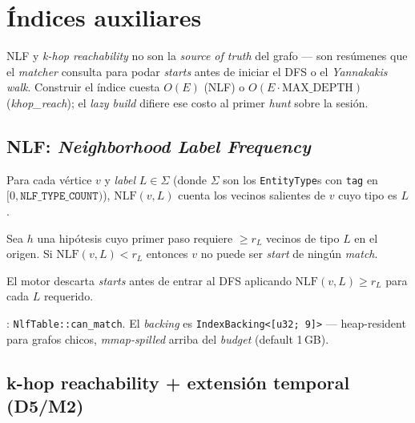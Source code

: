 \chapter{Índices auxiliares}
\label{cap:indexes}

\begin{intuicion}
NLF y \emph{k-hop reachability} no son la \emph{source of truth} del
grafo --- son resúmenes que el \emph{matcher} consulta para podar
\emph{starts} antes de iniciar el DFS o el \emph{Yannakakis walk}.
Construir el índice cuesta \(O(E)\) (NLF) o \(O(E \cdot \mathrm{MAX\_DEPTH})\)
(\emph{khop\_reach}); el \emph{lazy build} difiere ese costo al
primer \emph{hunt} sobre la sesión.
\end{intuicion}

\section{NLF: \emph{Neighborhood Label Frequency}}

\begin{definition}[NLF]
Para cada vértice \(v\) y \emph{label} \(L \in \Sigma\) (donde
\(\Sigma\) son los \texttt{EntityType}s con \texttt{tag} en
\([0, \texttt{NLF\_TYPE\_COUNT})\)), \(\mathrm{NLF}(v, L)\) cuenta
los vecinos salientes de \(v\) cuyo tipo es \(L\).
\end{definition}

\begin{theorem}
Sea \(h\) una hipótesis cuyo primer paso requiere \(\geq r_L\)
vecinos de tipo \(L\) en el origen. Si \(\mathrm{NLF}(v, L) < r_L\)
entonces \(v\) no puede ser \emph{start} de ningún \emph{match}.
\end{theorem}

El motor descarta \emph{starts} antes de entrar al DFS aplicando
\(\mathrm{NLF}(v, L) \geq r_L\) para cada \(L\) requerido.

\begin{enelcodigo}
: \texttt{NlfTable::can\_match}.
El \emph{backing} es \texttt{IndexBacking<[u32; 9]>} --- heap-resident
para grafos chicos, \emph{mmap-spilled} arriba del \emph{budget}
(default 1\,GB).
\end{enelcodigo}

\section{k-hop reachability + extensión temporal (D5/M2)}

